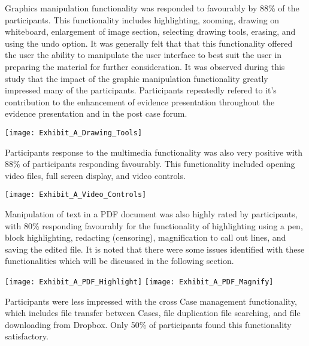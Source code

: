 




Graphics manipulation functionality was responded to favourably by 88\% of the participants. This functionality includes highlighting, zooming, drawing on whiteboard, enlargement of image section, selecting drawing tools, erasing, and using the undo option. It was generally felt that that this functionality offered the user the ability to manipulate the user interface to best suit the user in preparing the material for further consideration.
It was observed during this study that the impact of the graphic manipulation functionality greatly impressed many of the participants. Participants repeatedly refered to it's contribution to the enhancement of evidence presentation throughout the evidence presentation and in the post case forum.

\texttt{[image: Exhibit\_A\_Drawing\_Tools]}

Participants response to the multimedia functionality was also very positive with 88\% of participants responding favourably. This functionality included opening video files, full screen display, and video controls.  

\texttt{[image: Exhibit\_A\_Video\_Controls]}

Manipulation of text in a PDF document was also highly rated by participants, with 80\% responding favourably for the functionality of highlighting using a pen, block highlighting, redacting (censoring), magnification to call out lines, and saving the edited file. It is noted that there were some issues identified with these functionalities which will be discussed in the following section.

\texttt{[image: Exhibit\_A\_PDF\_Highlight]}
\texttt{[image: Exhibit\_A\_PDF\_Magnify]}

Participants were less impressed with the cross Case management functionality, which includes file transfer between Cases, file duplication file searching, and file downloading from Dropbox. Only 50\% of participants found this functionality satisfactory.

